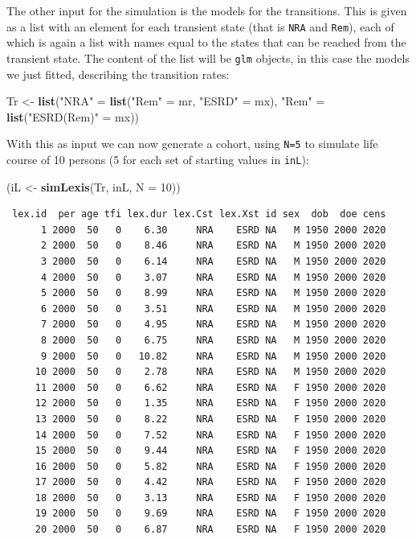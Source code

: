 \documentclass[
]{book}
\newenvironment{Shaded}{\begin{snugshade}}{\end{snugshade}}
\newcommand{\AttributeTok}[1]{\textcolor[rgb]{0.13,0.29,0.53}{#1}}
\newcommand{\DecValTok}[1]{\textcolor[rgb]{0.00,0.00,0.81}{#1}}
\newcommand{\FunctionTok}[1]{\textcolor[rgb]{0.13,0.29,0.53}{\textbf{#1}}}
\newcommand{\NormalTok}[1]{#1}
\newcommand{\OtherTok}[1]{\textcolor[rgb]{0.56,0.35,0.01}{#1}}
\newcommand{\StringTok}[1]{\textcolor[rgb]{0.31,0.60,0.02}{#1}}
\begin{document}
\begin{enumerate}
  The other input for the simulation is the models for the transitions. This is given as
  a list with an element for each transient state (that is \texttt{NRA} and
  \texttt{Rem}), each of which is again a list with names equal to the
  states that can be reached from the transient state. The content of
  the list will be \texttt{glm} objects, in this case the models we
  just fitted, describing the transition rates:

\begin{Shaded}
\begin{Highlighting}[]
\NormalTok{Tr }\OtherTok{\textless{}{-}} \FunctionTok{list}\NormalTok{(}\StringTok{"NRA"} \OtherTok{=} \FunctionTok{list}\NormalTok{(}\StringTok{"Rem"}  \OtherTok{=}\NormalTok{ mr,}
                        \StringTok{"ESRD"} \OtherTok{=}\NormalTok{ mx),}
           \StringTok{"Rem"} \OtherTok{=} \FunctionTok{list}\NormalTok{(}\StringTok{"ESRD(Rem)"} \OtherTok{=}\NormalTok{ mx))}
\end{Highlighting}
\end{Shaded}

  With this as input we can now generate a cohort, using \texttt{N=5}
  to simulate life course of 10 persons (5 for each set of starting values
  in \texttt{inL}):

\begin{Shaded}
\begin{Highlighting}[]
\NormalTok{(iL }\OtherTok{\textless{}{-}} \FunctionTok{simLexis}\NormalTok{(Tr, inL, }\AttributeTok{N =} \DecValTok{10}\NormalTok{))}
\end{Highlighting}
\end{Shaded}

\begin{verbatim}
 lex.id  per age tfi lex.dur lex.Cst lex.Xst id sex  dob  doe cens
      1 2000  50   0    6.30     NRA    ESRD NA   M 1950 2000 2020
      2 2000  50   0    8.46     NRA    ESRD NA   M 1950 2000 2020
      3 2000  50   0    6.14     NRA    ESRD NA   M 1950 2000 2020
      4 2000  50   0    3.07     NRA    ESRD NA   M 1950 2000 2020
      5 2000  50   0    8.99     NRA    ESRD NA   M 1950 2000 2020
      6 2000  50   0    3.51     NRA    ESRD NA   M 1950 2000 2020
      7 2000  50   0    4.95     NRA    ESRD NA   M 1950 2000 2020
      8 2000  50   0    6.75     NRA    ESRD NA   M 1950 2000 2020
      9 2000  50   0   10.82     NRA    ESRD NA   M 1950 2000 2020
     10 2000  50   0    2.78     NRA    ESRD NA   M 1950 2000 2020
     11 2000  50   0    6.62     NRA    ESRD NA   F 1950 2000 2020
     12 2000  50   0    1.35     NRA    ESRD NA   F 1950 2000 2020
     13 2000  50   0    8.22     NRA    ESRD NA   F 1950 2000 2020
     14 2000  50   0    7.52     NRA    ESRD NA   F 1950 2000 2020
     15 2000  50   0    9.44     NRA    ESRD NA   F 1950 2000 2020
     16 2000  50   0    5.82     NRA    ESRD NA   F 1950 2000 2020
     17 2000  50   0    4.42     NRA    ESRD NA   F 1950 2000 2020
     18 2000  50   0    3.13     NRA    ESRD NA   F 1950 2000 2020
     19 2000  50   0    9.69     NRA    ESRD NA   F 1950 2000 2020
     20 2000  50   0    6.87     NRA    ESRD NA   F 1950 2000 2020
\end{verbatim}


\end{enumerate}
\end{document}
